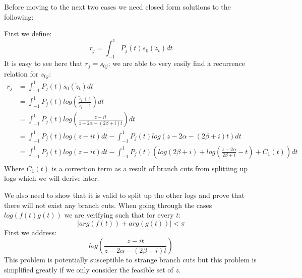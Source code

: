 \documentclass{article}
\begin{document}
Before moving to the next two cases we need closed form solutions to the following:

First we define: $$r_j = \int_{-1}^1P_j(t)s_0(\tilde{z}_t)dt$$
It is easy to see here that $r_j = s_{0j}$; we are able to very easily find a recurrence relation for $s_{0j}$:
\begin{align}
    r_j &= \int_{-1}^1P_j(t)s_0(\tilde{z}_t)dt\\
    &=\int_{-1}^1P_j(t)log(\frac{\tilde{z}_t+1}{\tilde{z}_t-1})dt\\
    &=\int_{-1}^1P_j(t)log(\frac{z-it}{z-2\alpha-(2\beta+i)t})dt\\
    &=\int_{-1}^1P_j(t)log(z-it)dt-\int_{-1}^1P_j(t)log(z-2\alpha-(2\beta+i)t)dt\\
    &=\int_{-1}^1P_j(t)log(z-it)dt
    -\int_{-1}^1P_j(t)(log(2\beta+i)+log(\frac{z-2\alpha}{2\beta+i}-t)+C_1(t))dt\\
\end{align}
Where $C_1(t)$ is a correction term as a result of branch cuts from splitting up logs which we will derive later.

We also need to show that it is valid to split up the other logs and prove that there will not exist any branch cuts.
When going through the cases $log(f(t)g(t))$ we are verifying such that for every $t$:
$$|arg(f(t))+arg(g(t))|<\pi$$
First we address:
$$log(\frac{z-it}{z-2\alpha-(2\beta+i)t})$$
This problem is potentially susceptible to strange branch cuts but this problem is simplified greatly if we only consider the feasible set of $z$.
\end{document}
